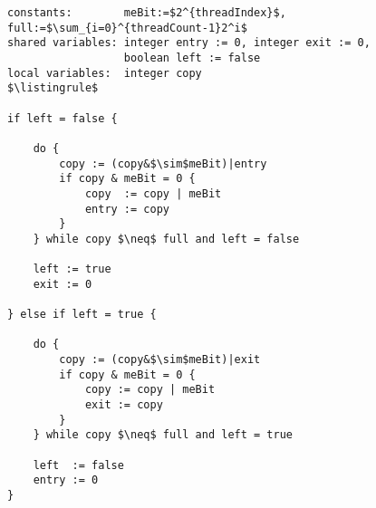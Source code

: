 \begin{lstlisting}[mathescape]
constants:        meBit:=$2^{threadIndex}$, full:=$\sum_{i=0}^{threadCount-1}2^i$
shared variables: integer entry := 0, integer exit := 0,
                  boolean left := false
local variables:  integer copy
$\listingrule$

if left = false {

	do {
		copy := (copy&$\sim$meBit)|entry
		if copy & meBit = 0 {
			copy  := copy | meBit
			entry := copy
		}
	} while copy $\neq$ full and left = false

	left := true
	exit := 0

} else if left = true {

	do {
		copy := (copy&$\sim$meBit)|exit
		if copy & meBit = 0 {
			copy := copy | meBit
			exit := copy
		}
	} while copy $\neq$ full and left = true

	left  := false
	entry := 0
}
\end{lstlisting}
